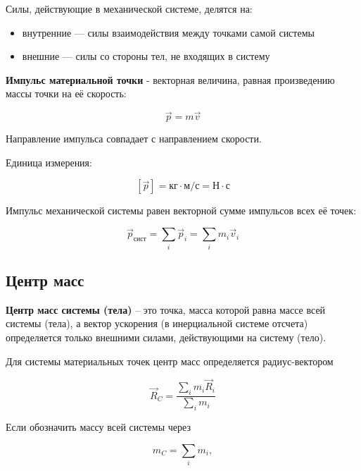 \documentclass[a4paper,12pt]{article}
\begin{document}
Силы, действующие в механической системе, делятся на:
\begin{itemize}
\item внутренние — силы взаимодействия между точками самой системы
\item внешние — силы со стороны тел, не входящих в систему
\end{itemize}

\vspace{0.8em}

\begin{definitionbox}
\textbf{Импульс материальной точки} - векторная величина, равная произведению массы точки на её скорость:
\end{definitionbox}

\[
\vec p = m \vec v
\]

Направление импульса совпадает с направлением скорости.

Единица измерения:

\[
[\vec p] = \text{кг} \cdot \text{м/с} = \text{Н} \cdot \text{с}
\]

\vspace{0.8em}

\begin{theorembox}
Импульс механической системы равен векторной сумме импульсов всех её точек:
\end{theorembox}

\[
\vec p_{\text{сист}}
=
\sum_i \vec p_i
=
\sum_i m_i \vec v_i
\]

\vspace{0.8em}

\subsection*{Центр масс}

\begin{definitionbox}
\textbf{Центр масс системы (тела)} – это точка, масса которой равна массе всей системы
(тела), а вектор ускорения (в инерциальной системе отсчета) определяется только
внешними силами, действующими на систему (тело).
\end{definitionbox}

Для системы материальных точек центр масс определяется радиус-вектором

\[
\vec R_C
=
\frac{\sum_i m_i \vec R_i}{\sum_i m_i}
\]

Если обозначить массу всей системы через

\[
m_C = \sum_i m_i,
\]
\end{document}
